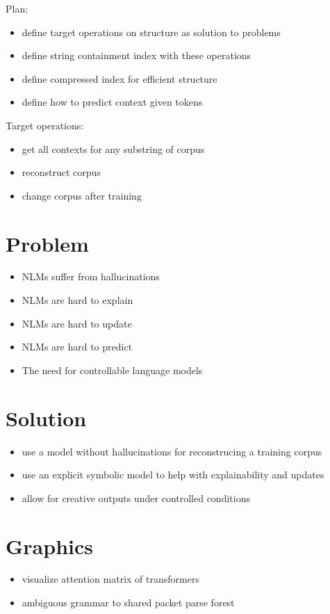 
Plan:
\begin{itemize}
\item define target operations on structure as solution to problems
\item define string containment index with these operations
\item define compressed index for efficient structure
\item define how to predict context given tokens
\end{itemize}


Target operations:
\begin{itemize}
\item get all contexts for any substring of corpus
\item reconstruct corpus
\item change corpus after training
\end{itemize}

\section{Problem}
\begin{itemize}
    \item NLMs suffer from hallucinations
    \item NLMs are hard to explain
    \item NLMs are hard to update
    \item NLMs are hard to predict
    \item The need for controllable language models
\end{itemize}
\section{Solution}
\begin{itemize}
    \item use a model without hallucinations for reconstrucing a training corpus
    \item use an explicit symbolic model to help with explainability and updates
    \item allow for creative outputs under controlled conditions
\end{itemize}

\section{Graphics}
\begin{itemize}
    \item visualize attention matrix of transformers
    \item ambiguous grammar to shared packet parse forest
\end{itemize}

